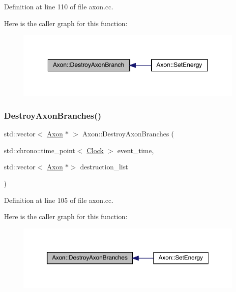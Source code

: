 Definition at line 110 of file axon.\+cc.

Here is the caller graph for this function\+:
\nopagebreak
\begin{figure}[H]
\begin{center}
\leavevmode
\includegraphics[width=342pt]{class_axon_a6ac580e4565d24c955b0a48d7a8b20e2_icgraph}
\end{center}
\end{figure}
\mbox{\label{class_axon_aa9d26eed8d178527d1995adfad2f67ac}} 
\subsubsection{\texorpdfstring{Destroy\+Axon\+Branches()}{DestroyAxonBranches()}}
{\footnotesize\ttfamily std\+::vector$<$ \hyperlink{class_axon}{Axon} $\ast$ $>$ Axon\+::\+Destroy\+Axon\+Branches (\begin{DoxyParamCaption}\item[{std\+::chrono\+::time\+\_\+point$<$ \hyperlink{universe_8h_a0ef8d951d1ca5ab3cfaf7ab4c7a6fd80}{Clock} $>$}]{event\+\_\+time,  }\item[{std\+::vector$<$ \hyperlink{class_axon}{Axon} $\ast$$>$}]{destruction\+\_\+list }\end{DoxyParamCaption})}



Definition at line 105 of file axon.\+cc.

Here is the caller graph for this function\+:
\nopagebreak
\begin{figure}[H]
\begin{center}
\leavevmode
\includegraphics[width=350pt]{class_axon_aa9d26eed8d178527d1995adfad2f67ac_icgraph}
\end{center}
\end{figure}
\mbox{\label{class_axon_a723b00504169712e47f7437111ad4ae3}} 
